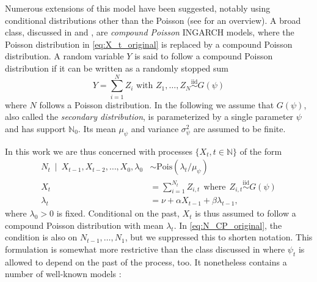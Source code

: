 \documentclass[review]{elsarticle}
\begin{document}
Numerous extensions of this model have been suggested, notably using conditional distributions other than the Poisson (see \cite{Weiss2018} for an overview). A broad class, discussed in \cite{Goncalves2015} and \cite{Silva2016}, are \textit{compound Poisson} INGARCH models, where the Poisson distribution in \eqref{eq:X_t_original} is replaced by a compound Poisson distribution. A random variable $Y$ is said to follow a compound Poisson distribution \cite[Chapter 3]{Feller1968} if it can be written as a randomly stopped sum 
$$
Y = \sum_{i = 1}^N Z_i \text{ with } Z_1, \dots, Z_N \stackrel{\text{iid}}{\sim} G(\psi)
$$
where $N$ follows a Poisson distribution. In the following we assume that $G(\psi)$, also called the \textit{secondary distribution}, is parameterized by a single parameter $\psi$ and has support $\mathbb{N}_0$. Its mean $\mu_\psi$ and variance $\sigma^2_\psi$ are assumed to be finite.

In this work we are thus concerned with processes $\{X_t, t \in \mathbb{N}\}$ of the form %
\begin{align}
N_t \ \mid \ X_{t - 1}, X_{t - 2}, \dots, X_0, \lambda_0 & \sim \text{Pois}(\lambda_t/\mu_\psi) \label{eq:N_CP_original}\\
X_t & = \sum_{i = 1}^{N_t} Z_{i, t} \ \ \text{where} \ \  Z_{i, t} \stackrel{\text{iid}}{\sim} G(\psi)\label{eq:X_CP_original}\\
\lambda_t & = \nu + \alpha X_{t - 1} + \beta \lambda_{t - 1},\label{eq:lambda_CP_original}
\end{align}
where $\lambda_0 > 0$ is fixed. Conditional on the past, $X_t$ is thus assumed to follow a compound Poisson distribution with mean $\lambda_t$. In \eqref{eq:N_CP_original}, the condition is also on $N_{t - 1}, \dots, N_1$, but we suppressed this to shorten notation. This formulation is somewhat more restrictive than the class discussed in \citep{Goncalves2015} where $\psi_t$ is allowed to depend on the past of the process, too. It nonetheless contains a number of well-known models \cite[Observation 2]{Goncalves2015}:
\end{document}
